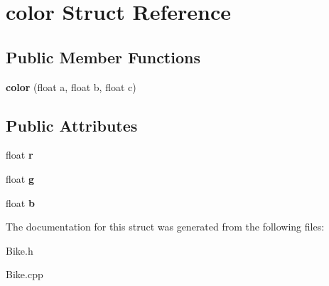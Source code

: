 \hypertarget{structcolor}{\section{color Struct Reference}
\label{structcolor}
}
\subsection*{Public Member Functions}
\begin{DoxyCompactItemize}
\item 
\hypertarget{structcolor_ab6a6df96024cf12e3987e1c36b889558}{{\bfseries color} (float a, float b, float c)}\label{structcolor_ab6a6df96024cf12e3987e1c36b889558}

\end{DoxyCompactItemize}
\subsection*{Public Attributes}
\begin{DoxyCompactItemize}
\item 
\hypertarget{structcolor_a243deecd95d1ee332b7119b17d54435c}{float {\bfseries r}}\label{structcolor_a243deecd95d1ee332b7119b17d54435c}

\item 
\hypertarget{structcolor_ab8f3c1452a83cb8a775a7d30edf47f6c}{float {\bfseries g}}\label{structcolor_ab8f3c1452a83cb8a775a7d30edf47f6c}

\item 
\hypertarget{structcolor_ab3ba8fa73820004898d32bb43cd6e4c7}{float {\bfseries b}}\label{structcolor_ab3ba8fa73820004898d32bb43cd6e4c7}

\end{DoxyCompactItemize}


The documentation for this struct was generated from the following files\-:\begin{DoxyCompactItemize}
\item 
Bike.\-h\item 
Bike.\-cpp\end{DoxyCompactItemize}
